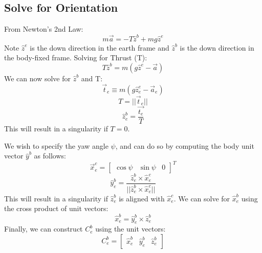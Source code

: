 \documentclass[10pt]{book}
\begin{document}
\subsection{Solve for Orientation}

From Newton's 2nd Law:
%
$$m\vec{a} = -T \hat{z}^b + m g \hat{z}^e$$
Note $\hat{z}^e$ is the down direction in the earth frame and $\hat{z}^b$ is the down direction in the body-fixed frame.
%
Solving for Thrust (T):
%
$$T \hat{z}^b = m (g \hat{z}^e - \vec{a})$$
%
We can now solve for $\hat{z}^b$ and T:
%
$$\vec{t}_e \equiv m(g \hat{z}^e_e - \vec{a}_e)$$
%
$$T = ||\vec{t}_e||$$
%
$$\hat{z}^b_e = \dfrac{\vec{t_e}}{T}$$
%
This will result in a singularity if $T = 0$.


We wish to specify the yaw angle $\psi$, and can do so by computing the body unit vector $\hat{y}^b$ as follows:
%
$$\vec{x}^c_e = \begin{bmatrix} \cos{\psi} & \sin{\psi} & 0 \end{bmatrix}^T$$
%
$$\hat{y}^b_e = \dfrac{\hat{z}^b_e \times \hat{x}^c_e}{||\hat{z}^b_e \times \hat{x}^c_e||}$$
This will result in a singularity if $\hat{z}^b_e$ is aligned with $\hat{x}^c_e$.
%
We can solve for $\hat{x}^b_e$ using the cross product of unit vectors:
%
$$\hat{x}^b_e = \hat{y}^b_e \times \hat{z}^b_e$$
%
Finally, we can construct $C^b_e$ using the unit vectors:
%
$$C^b_e = \begin{bmatrix} \hat{x}^b_e & \hat{y}^b_e & \hat{z}^b_e \end{bmatrix}$$
\end{document}
